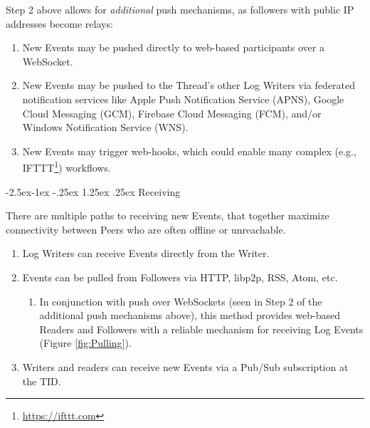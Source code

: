 \documentclass{textile}
\makeatletter
\renewcommand\paragraph{\@startsection{paragraph}{4}{\z@}%
            {-2.5ex\@plus -1ex \@minus -.25ex}%
            {1.25ex \@plus .25ex}%
            {\normalfont\normalsize\itshape}}
\makeatother
\begin{document}
Step 2 above allows for \emph{additional} push mechanisms, as followers with public IP addresses become relays:

\begin{enumerate}
  \item New Events may be pushed directly to web-based participants over a WebSocket.
  \item New Events may be pushed to the Thread's other Log Writers via federated notification services like Apple Push Notification Service (APNS), Google Cloud Messaging (GCM), Firebase Cloud Messaging (FCM), and/or Windows Notification Service (WNS).
  \item New Events may trigger web-hooks, which could enable many complex (e.g., IFTTT\footnote{\url{https://ifttt.com}}) workflows.
\end{enumerate}

\paragraph{Receiving}

There are multiple paths to receiving new Events, that together maximize connectivity between Peers who are often offline or unreachable.

\begin{enumerate}
  \item Log Writers can receive Events directly from the Writer.
  \item Events can be pulled from Followers via HTTP, libp2p, RSS, Atom, etc.

    \begin{enumerate}
      \item In conjunction with push over WebSockets (seen in Step 2 of the additional push mechanisms above), this method provides web-based Readers and Followers with a reliable mechanism for receiving Log Events (Figure \ref{fig:Pulling}).
    \end{enumerate}
  \item Writers and readers can receive new Events via a Pub/Sub subscription at the TID.
\end{enumerate}
\end{document}
